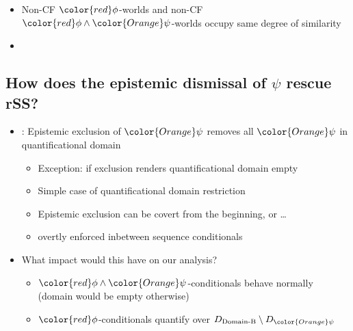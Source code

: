 \begin{frame}[t]
	\subsectionpage\vskip 9pt
	\begin{itemize}
        \item<1->	Non-CF ${\color{red}\phi}$-worlds and non-CF ${\color{red}\phi}\land{\color{Orange}\psi}$-worlds occupy same degree of similarity
	\end{itemize}\vspace{-5mm}
	\begin{figure}[ht!]
\centering

\label{fig:noncf}
\end{figure}\vspace{-7.5mm}
	\begin{itemize}
        \item<4->  
	\end{itemize}
\end{frame}

\subsection{How does the epistemic dismissal of $\psi$ rescue rSS?}
\begin{frame}[t]
    \subsectionpage\vskip 9pt
    \begin{itemize}
        \item<2-> \citet{krassnig2022ReverseSobel}: Epistemic exclusion of ${\color{Orange}\psi}$ removes all ${\color{Orange}\psi}$ in quantificational domain\vskip 9pt
            \begin{itemize}
                \item<3-> Exception: if exclusion renders quantificational domain empty
                \item<4-> Simple case of quantificational domain restriction \citep[amongst many others:][]{Fintel1994,Reimer1998,Stanley2000}\vskip 4.5pt
                \item<5-> Epistemic exclusion can be covert from the beginning, or \ldots
                \item<6-> overtly enforced inbetween sequence conditionals
            \end{itemize}\vskip 18pt
        \item<7-> What impact would this have on our analysis?\vskip 9pt
            \begin{itemize}
                \item<8-> ${\color{red}\phi}\land{\color{Orange}\psi}$-conditionals behave normally (domain would be empty otherwise)
                \item<9-> ${\color{red}\phi}$-conditionals quantify over $D_{\text{Domain-B}}\setminus D_{\color{Orange}\psi}$
            \end{itemize}
    \end{itemize}
\end{frame}

